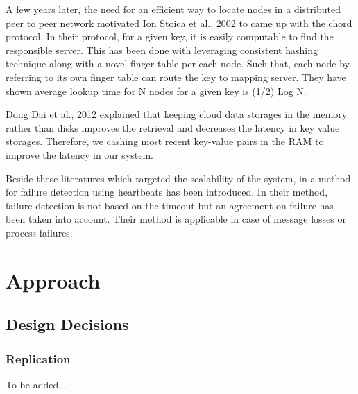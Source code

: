 \documentclass{sig-alternate}
\begin{document}
A few years later, the need for an efficient way to locate nodes in a distributed peer to peer network motivated Ion Stoica et al., 2002 \cite{chord} to came up with the chord protocol. In their protocol, for a given key,   it is easily computable to find the responsible server. This has been done with leveraging consistent hashing technique along with a novel finger table per each node. Such that, each node by referring to its own finger table can route the key to mapping server. They have shown average lookup time for N nodes for a given key is (1/2) Log N. 

Dong Dai et al., 2012 \cite{memory} explained that keeping cloud data storages in the memory rather than disks improves the retrieval and decreases the latency in key value storages. Therefore, we cashing most recent key-value pairs in the RAM to improve the latency in our system.

Beside these literatures which targeted the scalability of the system, in \cite{heartbeat} a method for failure detection using heartbeats has been introduced. In their method, failure detection is not based on the timeout  but an agreement on failure has been taken into account. Their method is applicable in case of message losses or process failures.


\section{Approach}
\subsection{Design Decisions}
\subsubsection{Replication}
To be added...
\end{document}

